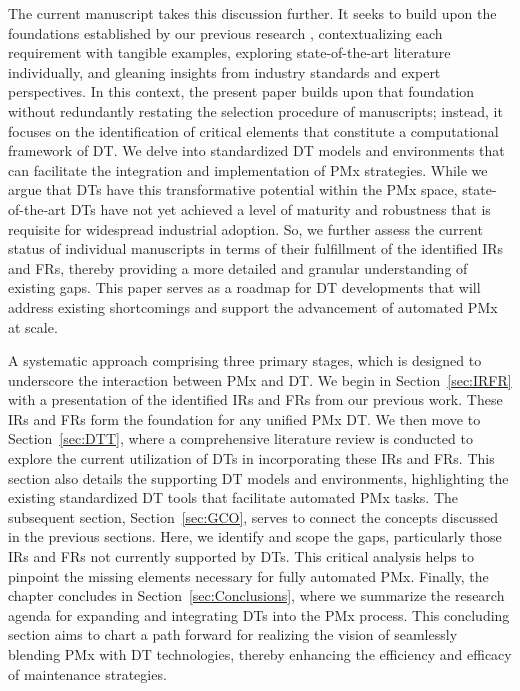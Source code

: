 \documentclass[runningheads]{llncs}
\begin{document}
The current manuscript takes this discussion further. It seeks to build upon the foundations established by our previous research \cite{ma2023twin}, contextualizing each requirement with tangible examples, exploring state-of-the-art literature individually, and gleaning insights from industry standards and expert perspectives. In this context, the present paper builds upon that foundation without redundantly restating the selection procedure of manuscripts; instead, it focuses on the identification of critical elements that constitute a computational framework of DT. We delve into standardized DT models and environments that can facilitate the integration and implementation of PMx strategies. While we argue that DTs have this transformative potential within the PMx space, state-of-the-art DTs have not yet achieved a level of maturity and robustness that is requisite for widespread industrial adoption. So, we further assess the current status of individual manuscripts in terms of their fulfillment of the identified IRs and FRs, thereby providing a more detailed and granular understanding of existing gaps. This paper serves as a roadmap for DT developments that will address existing shortcomings and support the advancement of automated PMx at scale.

A systematic approach comprising three primary stages, which is designed to underscore the interaction between PMx and DT. We begin in Section~\ref{sec:IRFR} with a presentation of the identified IRs and FRs from our previous work. These IRs and FRs form the foundation for any unified PMx DT. We then move to Section~\ref{sec:DTT}, where a comprehensive literature review is conducted to explore the current utilization of DTs in incorporating these IRs and FRs. This section also details the supporting DT models and environments, highlighting the existing standardized DT tools that facilitate automated PMx tasks. The subsequent section, Section~\ref{sec:GCO}, serves to connect the concepts discussed in the previous sections. Here, we identify and scope the gaps, particularly those IRs and FRs not currently supported by DTs. This critical analysis helps to pinpoint the missing elements necessary for fully automated PMx. Finally, the chapter concludes in Section~\ref{sec:Conclusions}, where we summarize the research agenda for expanding and integrating DTs into the PMx process. This concluding section aims to chart a path forward for realizing the vision of seamlessly blending PMx with DT technologies, thereby enhancing the efficiency and efficacy of maintenance strategies.
\end{document}
